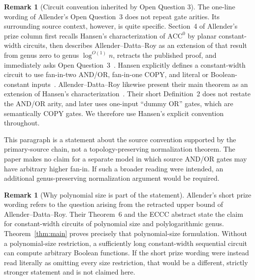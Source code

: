 \documentclass[11pt]{article}
\theoremstyle{definition}
\newtheorem{remark}[theorem]{Remark}
\newcommand{\ACC}{\mathrm{ACC}^{0}}
\begin{document}
\begin{remark}[Circuit convention inherited by Open Question 3]\label{rem:allender-model}
The one-line wording of Allender's Open Question~3 does not repeat gate arities.
Its surrounding source context, however, is quite specific.  Section~4 of
Allender's prize column first recalls Hansen's characterization of $\ACC$ by
planar constant-width circuits, then describes Allender--Datta--Roy as an
extension of that result from genus zero to genus $\log^{O(1)}n$, retracts the
published proof, and immediately asks Open Question~3~\cite{Allender2023}.
Hansen explicitly defines a constant-width circuit to use fan-in-two AND/OR,
fan-in-one COPY, and literal or Boolean-constant inputs~\cite{Hansen2006}.
Allender--Datta--Roy likewise present their main theorem as an extension of
Hansen's characterization~\cite{ADR2005,ECCC2004}.  Their short Definition~2
does not restate the AND/OR arity, and later uses one-input ``dummy OR'' gates,
which are semantically COPY gates.  We therefore use Hansen's explicit
convention throughout.

This paragraph is a statement about the source convention supported by the
primary-source chain, not a topology-preserving normalization theorem.  The
paper makes no claim for a separate model in which source AND/OR gates may have
arbitrary higher fan-in.  If such a broader reading were intended, an
additional genus-preserving normalization argument would be required.
\end{remark}

\begin{remark}[Why polynomial size is part of the statement]\label{rem:size}
Allender's short prize wording refers to the question arising from the
retracted upper bound of Allender--Datta--Roy.  Their Theorem~6 and the ECCC
abstract state the claim for constant-width circuits of polynomial size and
polylogarithmic genus.  Theorem~\ref{thm:main} proves precisely that
polynomial-size formulation.  Without a polynomial-size restriction, a
sufficiently long constant-width sequential circuit can compute arbitrary
Boolean functions.  If the short prize wording were instead read literally as
omitting every size restriction, that would be a different, strictly stronger
statement and is not claimed here.
\end{remark}
\end{document}
